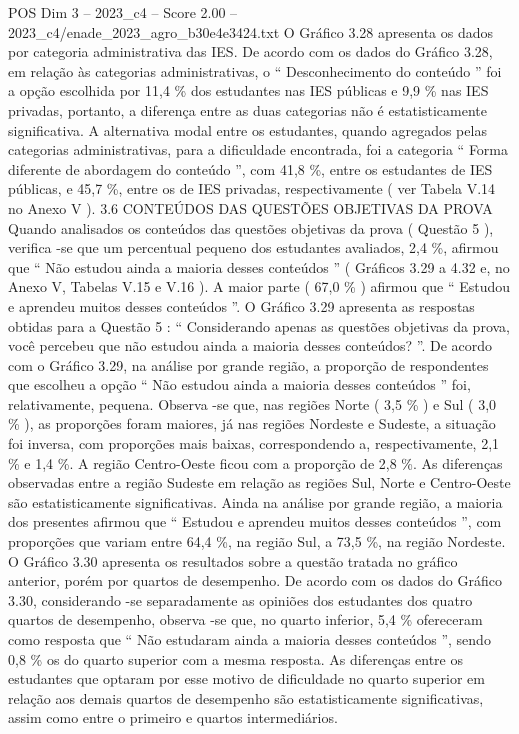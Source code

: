 \begin{textsample}{POS Dim 3 – 2023\_c4 – Score 2.00 – 2023\_c4/enade\_2023\_agro\_b30e4e3424.txt}
O Gráfico 3.28 apresenta os dados por categoria administrativa das IES.
De acordo com os dados do Gráfico 3.28, em relação às categorias administrativas, o “ Desconhecimento do conteúdo ” foi a opção escolhida por 11,4 \% dos estudantes nas IES públicas e 9,9 \% nas IES privadas, portanto, a diferença entre as duas categorias não é estatisticamente significativa.
A alternativa modal entre os estudantes, quando agregados pelas categorias administrativas, para a dificuldade encontrada, foi a categoria “ Forma diferente de abordagem do conteúdo ”, com 41,8 \%, entre os estudantes de IES públicas, e 45,7 \%, entre os de IES privadas, respectivamente ( ver Tabela V.14 no Anexo V ). 3.6 CONTEÚDOS DAS QUESTÕES OBJETIVAS DA PROVA Quando analisados os conteúdos das questões objetivas da prova ( Questão 5 ), verifica -se que um percentual pequeno dos estudantes avaliados, 2,4 \%, afirmou que “ Não estudou ainda a maioria desses conteúdos ” ( Gráficos 3.29 a 4.32 e, no Anexo V, Tabelas V.15 e V.16 ).
A maior parte ( 67,0 \% ) afirmou que “ Estudou e aprendeu muitos desses conteúdos ”.
O Gráfico 3.29 apresenta as respostas obtidas para a Questão 5 : “ Considerando apenas as questões objetivas da prova, você percebeu que não estudou ainda a maioria desses conteúdos? ”.
De acordo com o Gráfico 3.29, na análise por grande região, a proporção de respondentes que escolheu a opção “ Não estudou ainda a maioria desses conteúdos ” foi, relativamente, pequena.
Observa -se que, nas regiões Norte ( 3,5 \% ) e Sul ( 3,0 \% ), as proporções foram maiores, já nas regiões Nordeste e Sudeste, a situação foi inversa, com proporções mais baixas, correspondendo a, respectivamente, 2,1 \% e 1,4 \%.
A região Centro-Oeste ficou com a proporção de 2,8 \%.
As diferenças observadas entre a região Sudeste em relação as regiões Sul, Norte e Centro-Oeste são estatisticamente significativas.
Ainda na análise por grande região, a maioria dos presentes afirmou que “ Estudou e aprendeu muitos desses conteúdos ”, com proporções que variam entre 64,4 \%, na região Sul, a 73,5 \%, na região Nordeste.
O Gráfico 3.30 apresenta os resultados sobre a questão tratada no gráfico anterior, porém por quartos de desempenho.
De acordo com os dados do Gráfico 3.30, considerando -se separadamente as opiniões dos estudantes dos quatro quartos de desempenho, observa -se que, no quarto inferior, 5,4 \% ofereceram como resposta que “ Não estudaram ainda a maioria desses conteúdos ”, sendo 0,8 \% os do quarto superior com a mesma resposta.
As diferenças entre os estudantes que optaram por esse motivo de dificuldade no quarto superior em relação aos demais quartos de desempenho são estatisticamente significativas, assim como entre o primeiro e quartos intermediários.

\end{textsample}
